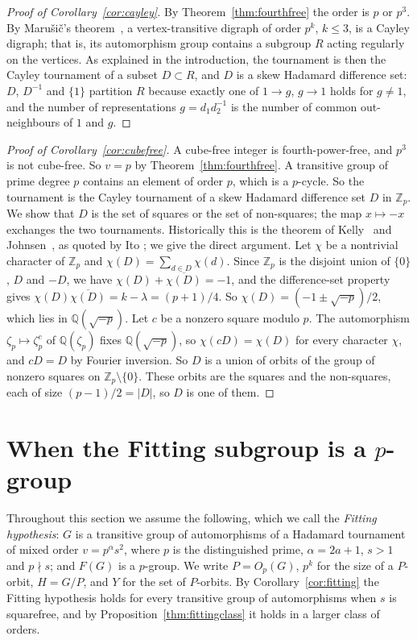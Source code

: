 \documentclass[11pt]{amsart}
\theoremstyle{definition}
\theoremstyle{remark}
\newcommand{\Q}{\mathbb{Q}}
\newcommand{\Z}{\mathbb{Z}}
\begin{document}
\begin{proof}[Proof of Corollary~\ref{cor:cayley}]
By Theorem~\ref{thm:fourthfree} the order is $p$ or $p^3$. By Maru\v{s}i\v{c}'s theorem~\cite[p.~115, abstract]{Marusic}, a vertex-transitive digraph of order $p^k$, $k\le3$, is a Cayley digraph; that is, its automorphism group contains a subgroup $R$ acting regularly on the vertices. As explained in the introduction, the tournament is then the Cayley tournament of a subset $D\subset R$, and $D$ is a skew Hadamard difference set: $D$, $D^{-1}$ and $\{1\}$ partition $R$ because exactly one of $1\to g$, $g\to1$ holds for $g\ne1$, and the number of representations $g=d_1d_2^{-1}$ is the number of common out-neighbours of $1$ and $g$.
\end{proof}


\begin{proof}[Proof of Corollary~\ref{cor:cubefree}]
A cube-free integer is fourth-power-free, and $p^3$ is not cube-free. So $v=p$ by Theorem~\ref{thm:fourthfree}. A transitive group of prime degree $p$ contains an element of order $p$, which is a $p$-cycle. So the tournament is the Cayley tournament of a skew Hadamard difference set $D$ in $\Z_p$. We show that $D$ is the set of squares or the set of non-squares; the map $x\mapsto-x$ exchanges the two tournaments. Historically this is the theorem of Kelly~\cite{Kelly} and Johnsen~\cite{Johnsen}, as quoted by Ito \cite[p.~37]{Ito84}; we give the direct argument. Let $\chi$ be a nontrivial character of $\Z_p$ and $\chi(D)=\sum_{d\in D}\chi(d)$. Since $\Z_p$ is the disjoint union of $\{0\}$, $D$ and $-D$, we have $\chi(D)+\overline{\chi(D)}=-1$, and the difference-set property gives $\chi(D)\overline{\chi(D)}=k-\lambda=(p+1)/4$. So $\chi(D)=(-1\pm\sqrt{-p})/2$, which lies in $\Q(\sqrt{-p})$. Let $c$ be a nonzero square modulo $p$. The automorphism $\zeta_p\mapsto\zeta_p^c$ of $\Q(\zeta_p)$ fixes $\Q(\sqrt{-p})$, so $\chi(cD)=\chi(D)$ for every character $\chi$, and $cD=D$ by Fourier inversion. So $D$ is a union of orbits of the group of nonzero squares on $\Z_p\setminus\{0\}$. These orbits are the squares and the non-squares, each of size $(p-1)/2=|D|$, so $D$ is one of them.
\end{proof}


\section{When the Fitting subgroup is a \texorpdfstring{$p$}{p}-group}\label{sec:linear}

Throughout this section we assume the following, which we call the \emph{Fitting hypothesis}: $G$ is a transitive group of automorphisms of a Hadamard tournament of mixed order $v=p^{\alpha}s^2$, where $p$ is the distinguished prime, $\alpha=2a+1$, $s>1$ and $p\nmid s$; and $F(G)$ is a $p$-group. We write $P=O_p(G)$, $p^k$ for the size of a $P$-orbit, $H=G/P$, and $Y$ for the set of $P$-orbits. By Corollary~\ref{cor:fitting} the Fitting hypothesis holds for every transitive group of automorphisms when $s$ is squarefree, and by Proposition~\ref{thm:fittingclass} it holds in a larger class of orders.
\end{document}
